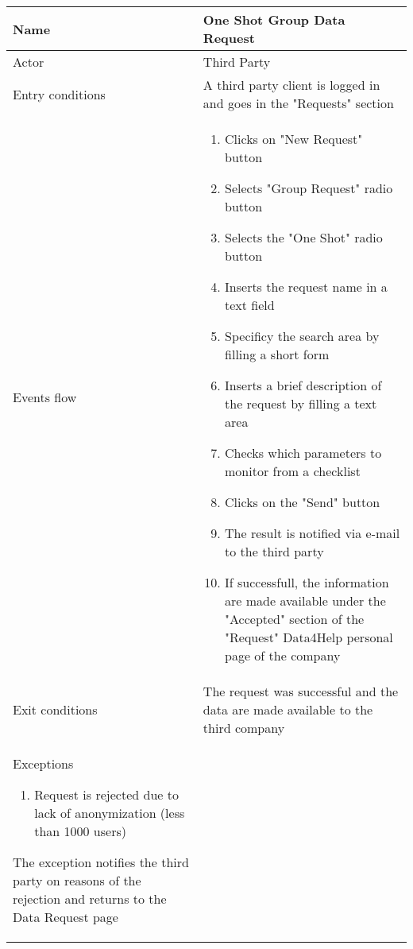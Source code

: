 \begin{table}[h!]
\begin{tabular}{|l|p{12cm}|}
\hline
Name             & One Shot Group Data Request \\ \hline
Actor            & Third Party \\ \hline
Entry conditions & A third party client is logged in and goes in the "Requests" section\\ \hline
Events flow      & \begin{enumerate}
\item Clicks on "New Request" button
\item Selects "Group Request" radio button
\item Selects the "One Shot" radio button
\item Inserts the request name in a text field
\item Specificy the search area by filling a short form
\item Inserts a brief description of the request by filling a text area
\item Checks which parameters to monitor from a checklist
\item Clicks on the "Send" button
\item The result is notified via e-mail to the third party
\item If successfull, the information are made available under the "Accepted" section of the "Request" Data4Help personal page of the company
\end{enumerate} \\ \hline
Exit conditions  & The request was successful and the data are made available to the third company \\ \hline
Exceptions       
\begin{enumerate}
\item Request is rejected due to lack of anonymization (less than 1000 users)
\end{enumerate} The exception notifies the third party on reasons of the rejection and returns to the Data Request page\\ \hline
\end{tabular}
\end{table}

